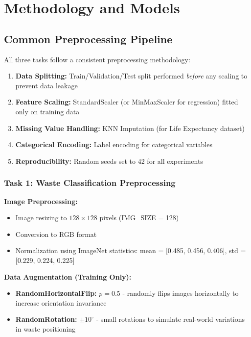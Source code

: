 \documentclass[11pt,a4paper]{article}
\begin{document}
\section{Methodology and Models}

\subsection{Common Preprocessing Pipeline}

All three tasks follow a consistent preprocessing methodology:

\begin{enumerate}
    \item \textbf{Data Splitting:} Train/Validation/Test split performed \textit{before} any scaling to prevent data leakage
    \item \textbf{Feature Scaling:} StandardScaler (or MinMaxScaler for regression) fitted only on training data
    \item \textbf{Missing Value Handling:} KNN Imputation (for Life Expectancy dataset)
    \item \textbf{Categorical Encoding:} Label encoding for categorical variables
    \item \textbf{Reproducibility:} Random seeds set to 42 for all experiments
\end{enumerate}

\subsubsection{Task 1: Waste Classification Preprocessing}

\textbf{Image Preprocessing:}
\begin{itemize}
    \item Image resizing to $128 \times 128$ pixels (IMG\_SIZE = 128)
    \item Conversion to RGB format
    \item Normalization using ImageNet statistics: mean = [0.485, 0.456, 0.406], std = [0.229, 0.224, 0.225]
\end{itemize}

\textbf{Data Augmentation (Training Only):}
\begin{itemize}
    \item \textbf{RandomHorizontalFlip:} $p = 0.5$ - randomly flips images horizontally to increase orientation invariance
    \item \textbf{RandomRotation:} $\pm 10^\circ$ - small rotations to simulate real-world variations in waste positioning
\end{itemize}
\end{document}
